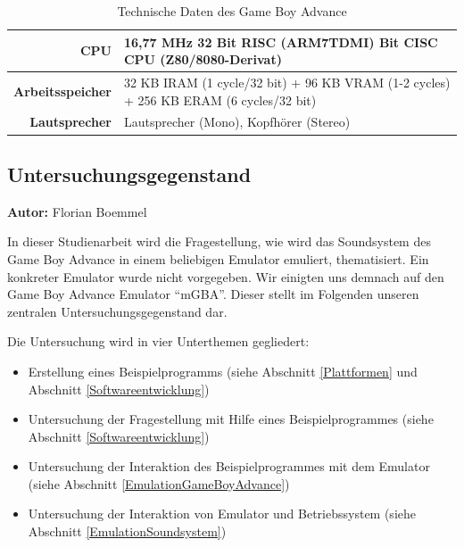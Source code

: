 \documentclass[11pt,a4paper]{scrartcl}
\newcommand{\AutorFlorian} {
    \vspace{-4mm}
    \large \textbf{Autor:} Florian Boemmel \normalsize
    \vspace{2mm}
}
\begin{document}
\begin{table}[h]
    \centering
    \begin{tabular}{ r | p{10cm} }
        \textbf{CPU} & 16,77 MHz 32 Bit RISC (ARM7TDMI)\newline
              8 Bit CISC CPU (Z80/8080-Derivat) \\
        \hline
        \textbf{Arbeitsspeicher} & 32 KB IRAM (1 cycle/32 bit)\newline
                          + 96 KB VRAM (1-2 cycles)\newline
                          + 256 KB ERAM (6 cycles/32 bit) \\
        \hline
        \textbf{Lautsprecher} & Lautsprecher (Mono), Kopfh\"orer (Stereo) \\
    \end{tabular}
    \caption{Technische Daten des Game Boy Advance \cite{GameBoyTechnischeDaten}}
    \label{table:TechnischeDaten}
\end{table}

\newpage

\subsection{Untersuchungsgegenstand}
\AutorFlorian

In dieser Studienarbeit wird die Fragestellung, wie wird das Soundsystem des Game Boy Advance in einem beliebigen Emulator emuliert, thematisiert. Ein konkreter Emulator wurde nicht vorgegeben. Wir einigten uns demnach auf den Game Boy Advance Emulator \enquote{mGBA}. Dieser stellt im Folgenden unseren zentralen Untersuchungsgegenstand dar.

Die Untersuchung wird in vier Unterthemen gegliedert:

\begin{itemize}
    \item Erstellung eines Beispielprogramms (siehe Abschnitt \ref{Plattformen} und Abschnitt \ref{Softwareentwicklung})
    \item Untersuchung der Fragestellung mit Hilfe eines Beispielprogrammes (siehe Abschnitt \ref{Softwareentwicklung})
    \item Untersuchung der Interaktion des Beispielprogrammes mit dem Emulator (siehe Abschnitt \ref{EmulationGameBoyAdvance})
    \item Untersuchung der Interaktion von Emulator und Betriebssystem (siehe Abschnitt \ref{EmulationSoundsystem})
\end{itemize}
\end{document}
